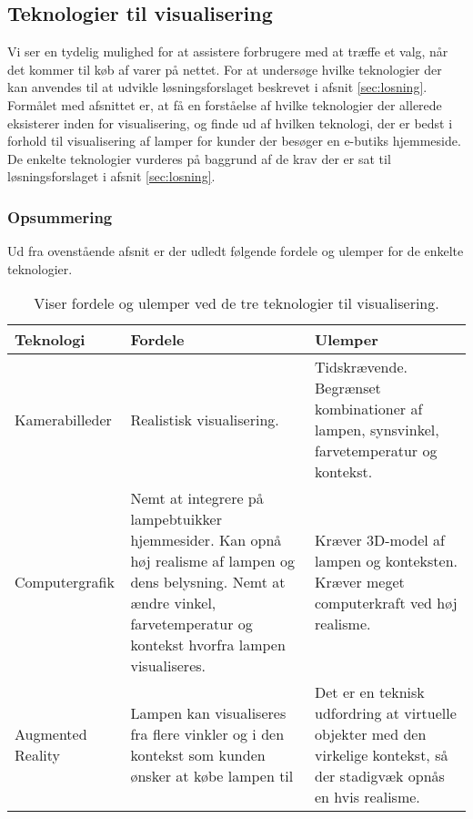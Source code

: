 \subsection{Teknologier til visualisering}
\label{sec:tek_til_visualisering}
Vi ser en tydelig mulighed for at assistere forbrugere med at træffe et valg, når det kommer til køb af varer på nettet. For at undersøge hvilke teknologier der kan anvendes til at udvikle løsningsforslaget beskrevet i afsnit \ref{sec:losning}. Formålet med afsnittet er, at få en forståelse af hvilke teknologier der allerede eksisterer inden for visualisering, og finde ud af hvilken teknologi, der er bedst i forhold til visualisering af lamper for kunder der besøger en e-butiks hjemmeside. De enkelte teknologier vurderes på baggrund af de krav der er sat til løsningsforslaget i afsnit \ref{sec:losning}.







\subsubsection*{Opsummering}
Ud fra ovenstående afsnit er der udledt følgende fordele og ulemper for de enkelte teknologier.
\begin{table}[H]
  \centering
  
\center
    \begin{tabular}{ | p{3cm} | p{5cm} | p{5cm} |}
    
    \hline
    Teknologi & Fordele & Ulemper \\ \hline
    Kamerabilleder & Realistisk visualisering. & Tidskrævende. Begrænset kombinationer af lampen, synsvinkel, farvetemperatur og kontekst. \\ \hline
   Computergrafik & Nemt at integrere på lampebtuikker hjemmesider. Kan opnå høj realisme af lampen og dens belysning. \newline Nemt at ændre vinkel, farvetemperatur og kontekst hvorfra lampen visualiseres. & Kræver 3D-model af lampen og konteksten. Kræver meget computerkraft ved høj realisme. \\ \hline
   Augmented Reality & Lampen kan visualiseres fra flere vinkler og i den kontekst som kunden ønsker at købe lampen til & Det er en teknisk udfordring at virtuelle objekter med den virkelige kontekst, så der stadigvæk opnås en hvis realisme. \\ \hline
    \end{tabular}
  \caption{Viser fordele og ulemper ved de tre teknologier til visualisering.}
\label{tab:fordele_ulemper_teknologier}
\end{table}

